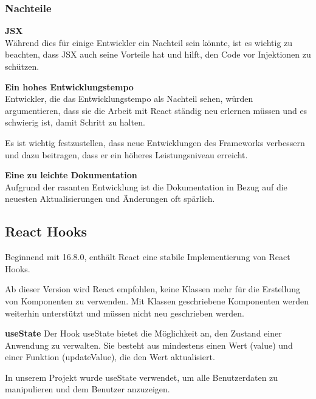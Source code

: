 \subsubsection{Nachteile}

\textbf{JSX}\\
Während dies für einige Entwickler ein Nachteil sein könnte, ist es wichtig zu beachten, dass JSX auch seine Vorteile hat und hilft, den Code vor Injektionen zu schützen.{\cite{R02}}
\newline

\textbf{Ein hohes Entwicklungstempo}\\
Entwickler, die das Entwicklungstempo als Nachteil sehen, würden argumentieren, dass sie die Arbeit mit React ständig neu erlernen müssen und es schwierig ist, damit Schritt zu halten.

Es ist wichtig festzustellen, dass neue Entwicklungen des Frameworks verbessern und dazu beitragen, dass er ein höheres Leistungsniveau erreicht.
\newline

\textbf{Eine zu leichte Dokumentation}\\
Aufgrund der rasanten Entwicklung ist die Dokumentation in Bezug auf die neuesten Aktualisierungen und Änderungen oft spärlich.{\cite{R01}}

\subsection{React Hooks}
Beginnend mit 16.8.0, enthält React eine stabile Implementierung von React Hooks.

Ab dieser Version wird React empfohlen, keine Klassen mehr für die Erstellung von Komponenten zu verwenden.
Mit Klassen geschriebene Komponenten werden weiterhin unterstützt und müssen nicht neu geschrieben werden.
{\cite{R05}}

\textbf{useState}
Der Hook useState bietet die Möglichkeit an, den Zustand einer Anwendung zu verwalten. Sie besteht aus mindestens einen Wert (value) und einer Funktion (updateValue), die den Wert aktualisiert.

In unserem Projekt wurde useState verwendet, um alle Benutzerdaten zu manipulieren und dem Benutzer anzuzeigen.


